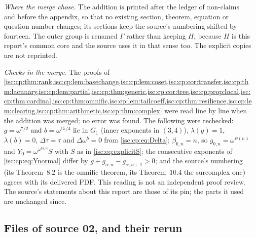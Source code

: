 \documentclass[11pt,letterpaper]{article}
\theoremstyle{definition}
\theoremstyle{remark}
\numberwithin{equation}{section}
\begin{document}
\emph{Where the merge chose.} The addition is printed after the ledger of
non-claims and before the appendix, so that no existing section, theorem,
equation or question number changes; its sections keep the source's
numbering shifted by fourteen. The outer group is renamed $\Gamma$ rather
than keeping $H$, because $H$ is this report's common core and the source
uses it in that sense too. The explicit copies are not reprinted.

\emph{Checks in the merge.} The proofs of
\cref{isc:cp:thm:rank,isc:cp:lem:basechange,isc:cp:lem:coset,isc:cp:cor:transfer,isc:cp:thm:lacunary,isc:cp:lem:partial,isc:cp:thm:generic,isc:cp:cor:tree,isc:cp:prop:local,isc:cp:thm:cardinal,isc:cp:thm:omnific,isc:cp:lem:tailcoeff,isc:cp:thm:resilience,isc:cp:lem:clearing,isc:cp:thm:arithmetic,isc:cp:thm:complex}
were read line by line when the addition was merged; no error was found.
The following were rechecked: $g=\omega^{7/2}$ and $b=\omega^{15/4}$ lie in
$G_1$ (inner exponents in $(3,4)$), $\lambda(g)=1$, $\lambda(b)=0$,
$\Delta\tau=\tau$ and $\Delta\omega^b=0$ from \eqref{isc:cp:eq:Delta};
$\beta_{0,n}=n$, so $g_{0,n}=\omega^{\psi(n)}$ and
$Y_0=\omega^{\omega^{15/4}}S$ with $S$ as in \eqref{isc:eq:explicitS}; the
consecutive exponents of \eqref{isc:cp:eq:Ynormal} differ by
$g+g_{\alpha,n}-g_{\alpha,n+1}>0$; and the source's numbering (its
Theorem~8.2 is the omnific theorem, its Theorem~10.4 the surcomplex one)
agrees with its delivered PDF. This reading is not an independent proof
review. The source's statements about this report are those of its pin;
the parts it used are unchanged since.

\subsection{Files of source 02, and their rerun}\label{isc:cp:app:files}
\end{document}
